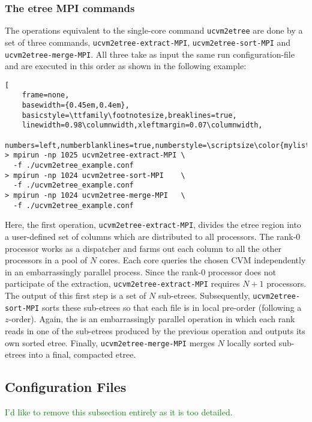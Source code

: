 \subsubsection{The etree MPI commands}

The operations equivalent to the single-core command \texttt{ucvm2etree} are done by a set of three commands, \texttt{ucvm2etree-extract-MPI}, \texttt{ucvm2etree-sort-MPI} and \texttt{ucvm2etree-merge-MPI}. All three take as input the same run configuration-file and are executed in this order as shown in the following example:

\begin{lstlisting}[
	frame=none,
	basewidth={0.45em,0.4em},
	basicstyle=\ttfamily\footnotesize,breaklines=true,
	linewidth=0.98\columnwidth,xleftmargin=0.07\columnwidth,
	numbers=left,numberblanklines=true,numberstyle=\scriptsize\color{mylistingnclr}]
> mpirun -np 1025 ucvm2etree-extract-MPI \
  -f ./ucvm2etree_example.conf
> mpirun -np 1024 ucvm2etree-sort-MPI    \
  -f ./ucvm2etree_example.conf
> mpirun -np 1024 ucvm2etree-merge-MPI   \
  -f ./ucvm2etree_example.conf
\end{lstlisting}

Here, the first operation, \texttt{ucvm2etree-extract-MPI}, divides the etree region into a user-defined set of columns which are distributed to all processors. The rank-0 processor works as a dispatcher and farms out each column to all the other processors in a pool of $N$ cores. Each core queries the chosen CVM independently in an embarrassingly parallel process. Since the rank-0 processor does not participate of the extraction, \texttt{ucvm2etree-extract-MPI} requires $N+1$ processors. The output of this first step is a set of $N$ sub-etrees. Subsequently, \texttt{ucvm2etree-sort-MPI} sorts these sub-etrees so that each file is in local pre-order (following a $z$-order). Again, the is an embarrassingly parallel operation in which each rank reads in one of the sub-etrees produced by the previous operation and outputs its own sorted etree. Finally, \texttt{ucvm2etree-merge-MPI} merges $N$ locally sorted sub-etrees into a final, compacted etree.

\subsection{Configuration Files}

\textcolor{green}{I'd like to remove this subsection entirely as it is too detailed.}

